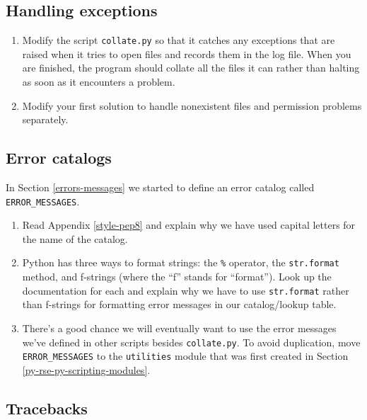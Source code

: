\documentclass[
]{krantz}
\providecommand{\tightlist}{%
  \setlength{\itemsep}{0pt}\setlength{\parskip}{0pt}}
\begin{document}
\hypertarget{errors-ex-exceptions}{%
\subsection{Handling exceptions}\label{errors-ex-exceptions}}

\begin{enumerate}
\def\labelenumi{\arabic{enumi}.}
\tightlist
\item
  Modify the script \texttt{collate.py} so that it catches any exceptions
  that are raised when it tries to open files
  and records them in the log file.
  When you are finished,
  the program should collate all the files it can
  rather than halting as soon as it encounters a problem.
\item
  Modify your first solution to handle nonexistent files
  and permission problems separately.
\end{enumerate}

\hypertarget{errors-ex-catalog}{%
\subsection{Error catalogs}\label{errors-ex-catalog}}

In Section \ref{errors-messages} we started to define an error catalog called \texttt{ERROR\_MESSAGES}.

\begin{enumerate}
\def\labelenumi{\arabic{enumi}.}
\tightlist
\item
  Read Appendix \ref{style-pep8} and explain why we have used capital letters
  for the name of the catalog.
\item
  Python has three ways to format strings:
  the \texttt{\%} operator, the \texttt{str.format} method, and f-strings (where the ``f'' stands for ``format'').
  Look up the documentation for each
  and explain why we have to use \texttt{str.format} rather than f-strings
  for formatting error messages in our catalog/lookup table.
\item
  There's a good chance we will eventually want to use the error messages we've defined
  in other scripts besides \texttt{collate.py}.
  To avoid duplication,
  move \texttt{ERROR\_MESSAGES} to the \texttt{utilities} module that was first created in
  Section \ref{py-rse-py-scripting-modules}.
\end{enumerate}

\hypertarget{errors-ex-traceback}{%
\subsection{Tracebacks}\label{errors-ex-traceback}}
\end{document}
